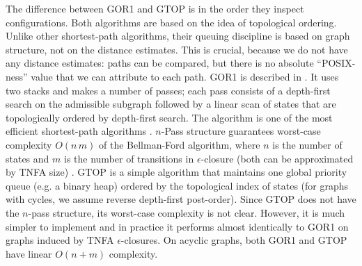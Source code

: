 \documentclass[AMA,STIX1COL]{WileyNJD-v2}
\begin{document}
The difference between GOR1 and GTOP is in the order they inspect configurations.
%
Both algorithms are based on the idea of topological ordering.
Unlike other shortest-path algorithms, their queuing discipline is based on graph structure, not on the distance estimates.
This is crucial, because we do not have any distance estimates:
paths can be compared, but there is no absolute ``POSIX-ness'' value that we can attribute to each path.
%
GOR1 is described in \cite{GR93}.
It uses two stacks and makes a number of passes;
each pass consists of a depth-first search on the admissible subgraph
followed by a linear scan of states that are topologically ordered by depth-first search.
The algorithm is one of the most efficient shortest-path algorithms \cite{CGR96}.
$n$-Pass structure guarantees worst-case complexity $O(n \, m)$ of the Bellman-Ford algorithm,
where $n$ is the number of states and $m$ is the number of transitions in $\epsilon$-closure
(both can be approximated by TNFA size) \cite{CGGTW09}.
%
GTOP is a simple algorithm that maintains one global priority queue (e.g. a binary heap)
ordered by the topological index of states (for graphs with cycles, we assume reverse depth-first post-order).
Since GTOP does not have the $n$-pass structure, its worst-case complexity is not clear.
However, it is much simpler to implement
and in practice it performs almost identically to GOR1 on graphs induced by TNFA $\epsilon$-closures.
%
On acyclic graphs, both GOR1 and GTOP have linear $O(n + m)$ complexity.
\\
\end{document}
